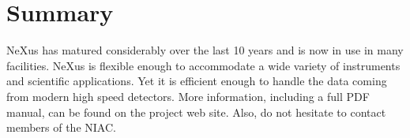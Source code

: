 \documentclass[%
 aip,
rsi,
 amsmath,amssymb,
 reprint,%
]{revtex4-1}
\begin{document}
\section{Summary}

NeXus has matured considerably over the last 10 years and is now in use in many facilities. NeXus 
is flexible enough to accommodate a wide variety of instruments and scientific applications. 
Yet it is efficient enough to 
handle the data coming from modern high speed detectors.
More information, including a full PDF manual, can be found on
  the project web site.\cite{nxwww}
Also, do not hesitate to contact members of the NIAC.


\nocite{*}
\end{document}
